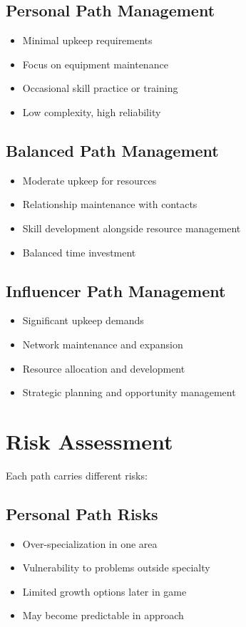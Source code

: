 \subsection*{Personal Path Management}
\begin{itemize}
\item Minimal upkeep requirements
\item Focus on equipment maintenance
\item Occasional skill practice or training
\item Low complexity, high reliability
\end{itemize}

\subsection*{Balanced Path Management}
\begin{itemize}
\item Moderate upkeep for resources
\item Relationship maintenance with contacts
\item Skill development alongside resource management
\item Balanced time investment
\end{itemize}

\subsection*{Influencer Path Management}
\begin{itemize}
\item Significant upkeep demands
\item Network maintenance and expansion
\item Resource allocation and development
\item Strategic planning and opportunity management
\end{itemize}

\section{Risk Assessment}

Each path carries different risks:

\subsection*{Personal Path Risks}
\begin{itemize}
\item Over-specialization in one area
\item Vulnerability to problems outside specialty
\item Limited growth options later in game
\item May become predictable in approach
\end{itemize}

